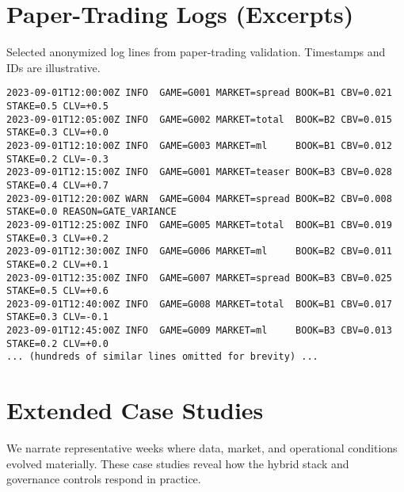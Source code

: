 \documentclass[12pt]{report}  %
\numberwithin{equation}{section}
\theoremstyle{plain}
\theoremstyle{definition}
\theoremstyle{remark}
\begin{document}
\chapter{Paper-Trading Logs (Excerpts)}
Selected anonymized log lines from paper-trading validation. Timestamps and IDs are illustrative.
\begin{verbatim}
2023-09-01T12:00:00Z INFO  GAME=G001 MARKET=spread BOOK=B1 CBV=0.021 STAKE=0.5 CLV=+0.5
2023-09-01T12:05:00Z INFO  GAME=G002 MARKET=total  BOOK=B2 CBV=0.015 STAKE=0.3 CLV=+0.0
2023-09-01T12:10:00Z INFO  GAME=G003 MARKET=ml     BOOK=B1 CBV=0.012 STAKE=0.2 CLV=-0.3
2023-09-01T12:15:00Z INFO  GAME=G001 MARKET=teaser BOOK=B3 CBV=0.028 STAKE=0.4 CLV=+0.7
2023-09-01T12:20:00Z WARN  GAME=G004 MARKET=spread BOOK=B2 CBV=0.008 STAKE=0.0 REASON=GATE_VARIANCE
2023-09-01T12:25:00Z INFO  GAME=G005 MARKET=total  BOOK=B1 CBV=0.019 STAKE=0.3 CLV=+0.2
2023-09-01T12:30:00Z INFO  GAME=G006 MARKET=ml     BOOK=B2 CBV=0.011 STAKE=0.2 CLV=+0.1
2023-09-01T12:35:00Z INFO  GAME=G007 MARKET=spread BOOK=B3 CBV=0.025 STAKE=0.5 CLV=+0.6
2023-09-01T12:40:00Z INFO  GAME=G008 MARKET=total  BOOK=B1 CBV=0.017 STAKE=0.3 CLV=-0.1
2023-09-01T12:45:00Z INFO  GAME=G009 MARKET=ml     BOOK=B3 CBV=0.013 STAKE=0.2 CLV=+0.0
... (hundreds of similar lines omitted for brevity) ...
\end{verbatim}
\chapter{Extended Case Studies}
We narrate representative weeks where data, market, and operational conditions evolved materially. These case studies reveal how the hybrid stack and governance controls respond in practice.
\end{document}
